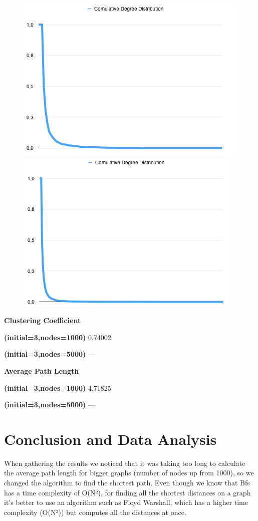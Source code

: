 \documentclass[a4paper,titlepage,11pt]{article}
\begin{document}
\begin{figure}[h]
    \centering
    \includegraphics[scale=0.50]{img/cdd-minimal-3-1000.png}
    \includegraphics[scale=0.50]{img/cdd-minimal-3-5000.png}
\end{figure}

\begin{multicols}{2}

  \textbf{Clustering Coefficient}

  \textbf{(initial=3,nodes=1000)} 0,74002

  \textbf{(initial=3,nodes=5000)} ---

\columnbreak

  \textbf{Average Path Length}

  \textbf{(initial=3,nodes=1000)} 4,71825

  \textbf{(initial=3,nodes=5000)} ---

\end{multicols}

\section{Conclusion and Data Analysis}
When gathering the results we noticed that it was taking too long to calculate the average path length for bigger graphs
(number of nodes up from 1000), so we changed the algorithm to find the shortest path. Even though we know that Bfs has a
time complexity of O(N²), for finding all the shortest distances on a graph it's better to use an algorithm such as Floyd Warshall,
which has a higher time complexity (O(N³)) but computes all the distances at once.
\end{document}
